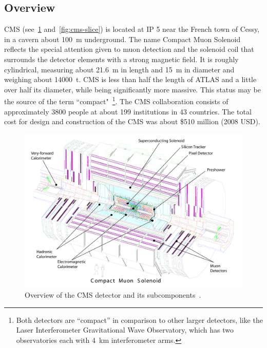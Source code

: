 \subsection{Overview}
\label{sec:cms-overview}
CMS (see~\cref{fig:cms-overview} and~\cref{fig:cms-slice}) is located at IP 5
near the French town of Cessy, in a cavern about \SI{100}{\meter} underground.
The name Compact Muon Solenoid reflects the special attention given to muon
detection and the solenoid coil that surrounds the detector elements with a
strong magnetic field. It is roughly cylindrical, measuring about
\SI{21.6}{\meter} in length and \SI{15}{\meter} in diameter and weighing about
\SI{14000}{\tonne}. CMS is less than half the length of ATLAS and a little over
half its diameter, while being significantly more massive. This status may be
the source of the term ``compact"~\footnote{Both detectors are ``compact'' in
comparison to other larger detectors, like the Laser Interferometer
Gravitational Wave Observatory, which has two observatories each with
\SI{4}{\kilo\meter} interferometer arms.}. The CMS collaboration consists of
approximately \num{3800} people at about \num{199} institutions in \num{43}
countries. The total cost for design and construction of the CMS was about \$510
million (2008 USD).
\begin{figure}[tb]
  \includegraphics[width=0.7\textheight]{figures/cms_complete_labelled}
  \caption[Overview of the CMS detector]{Overview of the CMS
  detector and its subcomponents~\cite{cms-tdr-1}.}
  \label{fig:cms-overview}
\end{figure}
